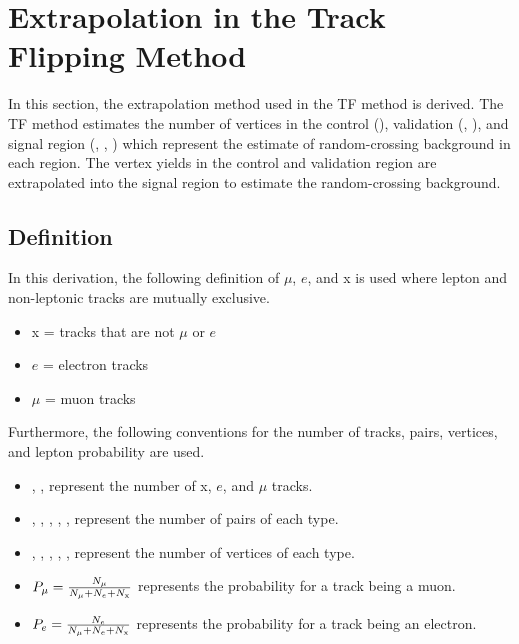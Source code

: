 \section{Extrapolation in the Track Flipping Method}
In this section, the extrapolation method used in the TF method is derived. The TF method estimates the number of vertices in the control (\xx), validation (\mux, \ex), and signal region (\mumu, \ee, \emu) which represent the estimate of random-crossing background in each region. %
The vertex yields in the control and validation region are extrapolated into the signal region to estimate the random-crossing background.



\subsection{Definition}
In this derivation, the following definition of $\mu$, $e$, and x is used where lepton and non-leptonic tracks are mutually exclusive.
\begin{itemize}
\item x = tracks that are not $\mu$ or $e$
\item $e$ = electron tracks
\item $\mu$ = muon tracks 
\end{itemize}

Furthermore, the following conventions for the number of tracks, pairs, vertices, and lepton probability are used.
\begin{itemize}
\item \Nx, \Ne, \Nm represent the number of x, $e$, and $\mu$ tracks.
\item \Nxx, \Nmx, \Nex, \Nmm, \Nee, \Nem represent the number of pairs of each type.
\item \NVxx{}, \NVmx{}, \NVex{}, \NVmm{}, \NVee{}, \NVem{} represent the number of vertices of each type.
\item $P_{\mu}  = \frac{N_{\mu}}{N_{\mu} + N_{e} + N_{\mathrm{x}}}$ represents the probability for a track being a muon.
\item $P_{e}  = \frac{N_{e}}{N_{\mu} + N_{e} + N_{\mathrm{x}}}$ represents the probability for a track being an electron.
\end{itemize}


